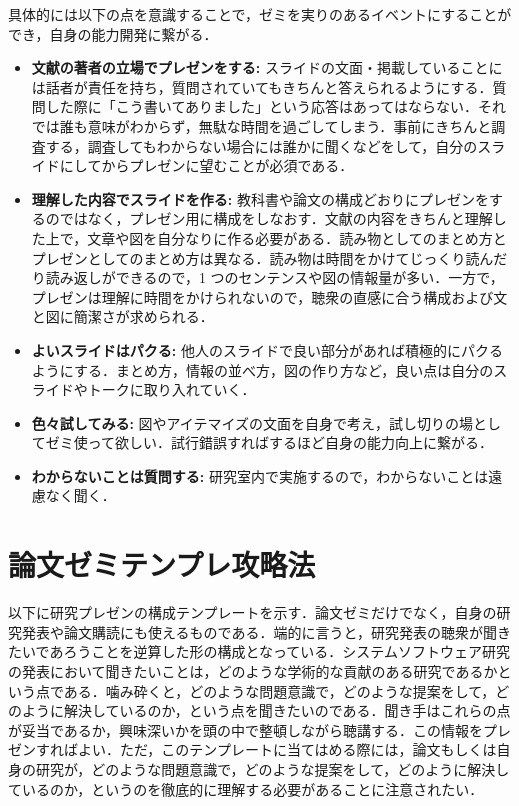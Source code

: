\documentclass[a4j]{jarticle}
\begin{document}
具体的には以下の点を意識することで，ゼミを実りのあるイベントにすることができ，自身の能力開発に繋がる．

\begin{itemize}
  \item \textbf{文献の著者の立場でプレゼンをする:} スライドの文面・掲載していることには話者が責任を持ち，質問されていてもきちんと答えられるようにする．質問した際に「こう書いてありました」という応答はあってはならない．それでは誰も意味がわからず，無駄な時間を過ごしてしまう．事前にきちんと調査する，調査してもわからない場合には誰かに聞くなどをして，自分のスライドにしてからプレゼンに望むことが必須である．

  \item \textbf{理解した内容でスライドを作る:} 教科書や論文の構成どおりにプレゼンをするのではなく，プレゼン用に構成をしなおす．文献の内容をきちんと理解した上で，文章や図を自分なりに作る必要がある．読み物としてのまとめ方とプレゼンとしてのまとめ方は異なる．読み物は時間をかけてじっくり読んだり読み返しができるので，1 つのセンテンスや図の情報量が多い．一方で，プレゼンは理解に時間をかけられないので，聴衆の直感に合う構成および文と図に簡潔さが求められる．

  \item \textbf{よいスライドはパクる:} 他人のスライドで良い部分があれば積極的にパクるようにする．まとめ方，情報の並べ方，図の作り方など，良い点は自分のスライドやトークに取り入れていく．

  \item \textbf{色々試してみる:} 図やアイテマイズの文面を自身で考え，試し切りの場としてゼミ使って欲しい．試行錯誤すればするほど自身の能力向上に繋がる．

  \item \textbf{わからないことは質問する:} 研究室内で実施するので，わからないことは遠慮なく聞く．

\end{itemize}


\section*{論文ゼミテンプレ攻略法}

以下に研究プレゼンの構成テンプレートを示す．論文ゼミだけでなく，自身の研究発表や論文購読にも使えるものである．端的に言うと，研究発表の聴衆が聞きたいであろうことを逆算した形の構成となっている．システムソフトウェア研究の発表において聞きたいことは，どのような学術的な貢献のある研究であるかという点である．噛み砕くと，どのような問題意識で，どのような提案をして，どのように解決しているのか，という点を聞きたいのである．聞き手はこれらの点が妥当であるか，興味深いかを頭の中で整頓しながら聴講する．この情報をプレゼンすればよい．ただ，このテンプレートに当てはめる際には，論文もしくは自身の研究が，どのような問題意識で，どのような提案をして，どのように解決しているのか，というのを徹底的に理解する必要があることに注意されたい．
\end{document}

